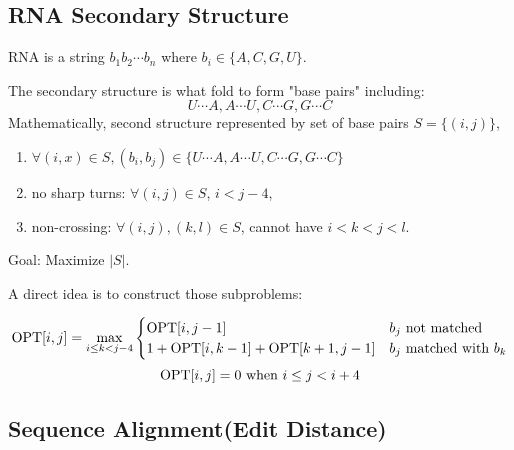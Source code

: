 
\subsection{RNA Secondary Structure}
\begin{example}
    RNA is a string  $ b_1b_2\cdots b_n $  where  $ b_i\in \{A,C,G,U\} $.
    
    The secondary structure is what fold to form "base pairs" including:
    \[U\cdots A,A\cdots U,C\cdots G,G\cdots C\]
    Mathematically, second structure represented by set of base pairs  $ S=\{(i,j)\} $, 
    \begin{enumerate}[label=*)]
        \item  $ \forall (i,x)\in S,(b_i,b_j)\in \{U\cdots A,A\cdots U,C\cdots G,G\cdots C\} $
        \item no sharp turns:  $ \forall (i,j)\in S $,  $ i<j-4 $,
        \item non-crossing:  $ \forall (i,j),(k,l)\in S $, cannot have  $ i<k<j<l $.     
    \end{enumerate} 
    Goal: Maximize  $ |S| $. 
\end{example}

A direct idea is to construct those subproblems:

\[\mathrm{OPT}[i,j]=\max_{i \leq k<j-4}\begin{cases}
    \mathrm{OPT}[i,j-1] &b_j \text{ not matched}\\
    1+\mathrm{OPT}[i,k-1]+\mathrm{OPT}[k+1,j-1] &b_j\text{ matched with }b_k
\end{cases}\]
\[\mathrm{OPT}[i,j]=0\text{ when }i \leq j<i+4\]


\subsection{Sequence Alignment(Edit Distance)}


